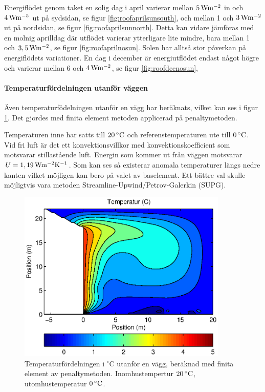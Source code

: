 Energiflödet genom taket en solig dag i april varierar mellan $\unit[5]{W m^{-2}}$ in och $\unit[4]{W m^{-5}}$ ut på sydsidan, se figur \ref{fig:roofaprilsunsouth}, och mellan 1 och $\unit[3]{W m^{-2}}$ ut på nordsidan, se figur \ref{fig:roofaprilsunnorth}. Detta kan vidare jämföras med en molnig aprilldag där utflödet varierar ytterligare lite mindre, bara mellan 1 och $\unit[3,5]{W m^{-2}}$, se figur \ref{fig:roofaprilnosun}. Solen har alltså stor påverkan på energiflödets variationer. En dag i december är energiutflödet endast något högre och varierar mellan 6 och $\unit[4]{W m^{-2}}$, se figur \ref{fig:roofdecnosun},


\paragraph{Temperaturfördelningen utanför väggen}

Även temperaturfödelningen utanför en vägg har beräknats, vilket kan ses i figur \ref{fig:temp_dist}. Det gjordes med finita element metoden applicerad på penaltymetoden.

Temperaturen inne har satts till $\unit[20]{^\circ C}$ och referenstemperaturen ute till 
$\unit[0]{^\circ C}$. Vid fri luft är det ett konvektionsvillkor med konvektionskoefficient 
som motsvarar stillastående luft. Energin som kommer ut från väggen motsvarar 
$U = \unit[1,19]{Wm^{-2}K^{-1}}$. Som kan ses så existerar anomala temperaturer längs 
nedre kanten vilket möjligen kan bero på valet av baselement. Ett bättre val skulle möjligtvis vara metoden Streamline-Upwind/Petrov-Galerkin (SUPG).


\begin{figure}[hpbt]
\centering
\includegraphics[width=10cm]{images/convectemperature.eps}
\caption{\label{fig:temp_dist}Temperaturfördelningen i $^\circ\mbox{C}$ utanför en vägg, beräknad med finita element av penaltymetoden. Inomhustempertur $\unit[20]{^\circ C}$, utomhustemperatur $\unit[0]{^\circ C}$.}
\end{figure}

